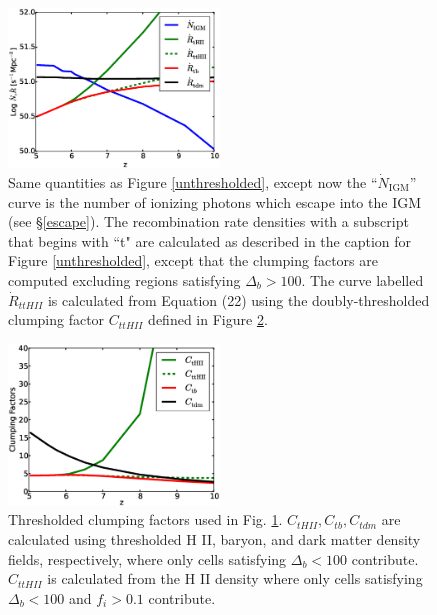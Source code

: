 \begin{figure}
	\includegraphics[width=0.5\textwidth]{thresholded.eps}
	\caption{Same quantities as Figure \ref{unthresholded}, except now the ``$\dot{N}_\mathrm{IGM}$'' curve is the number of ionizing photons which escape into the IGM (see \S\ref{escape}). The recombination rate densities with a subscript that begins with ``t" are calculated as described in the caption for Figure \ref{unthresholded}, except that the clumping factors are computed excluding regions satisfying $\Delta_b > 100$. The curve labelled $\dot{R}_{ttHII}$ is calculated from Equation (22) using the doubly-thresholded clumping factor $C_{ttHII}$ defined in Figure \ref{threshclumping}.}
	\label{thresholded}
\end{figure}

\begin{figure}
	\includegraphics[width=0.5\textwidth]{threshclumping.eps}
	\caption{Thresholded clumping factors used in Fig. \ref{thresholded}. $C_{tHII}, C_{tb}, C_{tdm}$ are calculated using thresholded H II, baryon, and dark matter density fields, respectively, where only cells satisfying $\Delta_b < 100$ contribute. $C_{ttHII}$ is calculated from the H II density where only cells satisfying $\Delta_b < 100$ and $f_i > 0.1$ contribute.}
	\label{threshclumping}
\end{figure}

